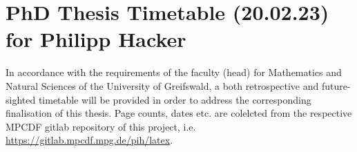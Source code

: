 \documentclass[%
    a4,
    10pt,
    twoside
    ]{%
    scrreprt%
    }
\newcommand{\foo}{%
  \hspace{-2.3pt}$\bullet$ \hspace{5pt}%
}
\begin{document}
%

  \thispagestyle{empty}

  \section*{%
    PhD Thesis Timetable (20.02.23) for Philipp Hacker%
  }%
    
  In accordance with the requirements of the faculty (head) for Mathematics and Natural Sciences of the University of Greifswald, a both retrospective and future-sighted timetable will be provided in order to address the corresponding finalisation of this thesis. Page counts, dates etc. are colelcted from the respective MPCDF gitlab repository of this project, i.e. 
  \url{https://gitlab.mpcdf.mpg.de/pih/latex}.

  \begin{table}[h!]%

    \begin{tabular}{r |@{\foo} p{}}%


\end{tabular}
\end{table}
\end{document}
